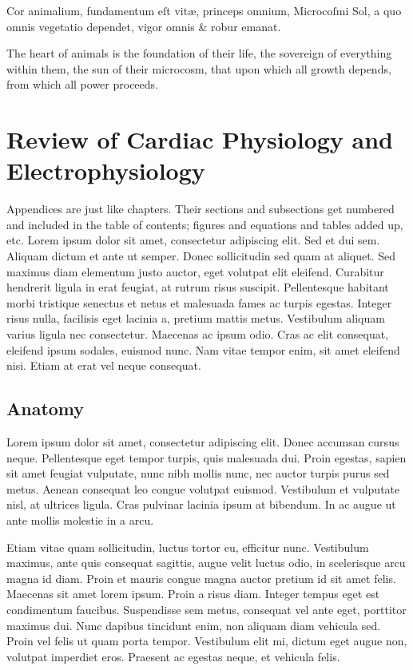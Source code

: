 \begin{savequote}[8cm]
\textlatin{Cor animalium, fundamentum eſt vitæ, princeps omnium, Microcoſmi Sol, a quo omnis vegetatio dependet, vigor omnis \& robur emanat.}

The heart of animals is the foundation of their life, the sovereign of everything within them, the sun of their microcosm, that upon which all growth depends, from which all power proceeds.
\end{savequote}

\chapter{\label{app:1-cardiophys}Review of Cardiac Physiology and Electrophysiology}

\minitoc

Appendices are just like chapters.  Their sections and subsections get numbered and included in the table of contents; figures and equations and tables added up, etc.  Lorem ipsum dolor sit amet, consectetur adipiscing elit. Sed et dui sem. Aliquam dictum et ante ut semper. Donec sollicitudin sed quam at aliquet. Sed maximus diam elementum justo auctor, eget volutpat elit eleifend. Curabitur hendrerit ligula in erat feugiat, at rutrum risus suscipit. Pellentesque habitant morbi tristique senectus et netus et malesuada fames ac turpis egestas. Integer risus nulla, facilisis eget lacinia a, pretium mattis metus. Vestibulum aliquam varius ligula nec consectetur. Maecenas ac ipsum odio. Cras ac elit consequat, eleifend ipsum sodales, euismod nunc. Nam vitae tempor enim, sit amet eleifend nisi. Etiam at erat vel neque consequat.

\section{Anatomy}
\label{sec:anatomy}

Lorem ipsum dolor sit amet, consectetur adipiscing elit. Donec accumsan cursus neque. Pellentesque eget tempor turpis, quis malesuada dui. Proin egestas, sapien sit amet feugiat vulputate, nunc nibh mollis nunc, nec auctor turpis purus sed metus. Aenean consequat leo congue volutpat euismod. Vestibulum et vulputate nisl, at ultrices ligula. Cras pulvinar lacinia ipsum at bibendum. In ac augue ut ante mollis molestie in a arcu.

Etiam vitae quam sollicitudin, luctus tortor eu, efficitur nunc. Vestibulum maximus, ante quis consequat sagittis, augue velit luctus odio, in scelerisque arcu magna id diam. Proin et mauris congue magna auctor pretium id sit amet felis. Maecenas sit amet lorem ipsum. Proin a risus diam. Integer tempus eget est condimentum faucibus. Suspendisse sem metus, consequat vel ante eget, porttitor maximus dui. Nunc dapibus tincidunt enim, non aliquam diam vehicula sed. Proin vel felis ut quam porta tempor. Vestibulum elit mi, dictum eget augue non, volutpat imperdiet eros. Praesent ac egestas neque, et vehicula felis.

